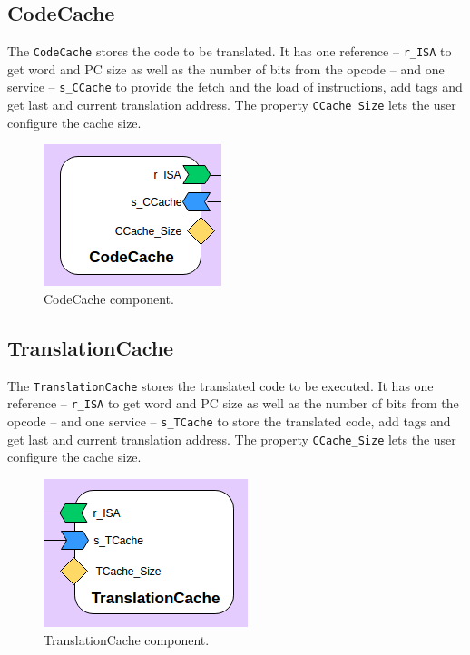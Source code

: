 \documentclass[11pt]{report}
\begin{document}
		\subsection{CodeCache}
		
		\par The \texttt{CodeCache} stores the code to be translated. It has one reference -- \texttt{r\_ISA} to get word and PC size as well as the number of bits from the opcode -- and one service -- \texttt{s\_CCache} to provide the fetch and the load of instructions, add tags and get last and current translation address. The property \texttt{CCache\_Size} lets the user configure the cache size. 
		
		\begin{figure} [H]
			\centering
			\includegraphics[width=0.3\linewidth]{Images/arch-ref/CodeCache}
			\caption{CodeCache component.}
			\label{fig:CodeCache}
		\end{figure}
		
		\subsection{TranslationCache}
		
		\par The \texttt{TranslationCache} stores the translated code to be executed. It has one reference -- \texttt{r\_ISA} to get word and PC size as well as the number of bits from the opcode -- and one service -- \texttt{s\_TCache} to store the translated code, add tags and get last and current translation address. The property \texttt{CCache\_Size} lets the user configure the cache size. 
		
		\begin{figure} [H]
			\centering
			\includegraphics[width=0.3\linewidth]{Images/arch-ref/TranslationCache}
			\caption{TranslationCache component.}
			\label{fig:TranslationCache}
		\end{figure}
		
\end{document}
